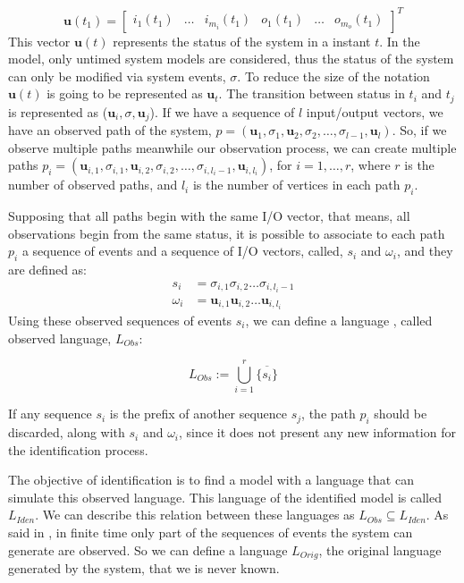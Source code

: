 \begin{equation*}
\mathbf{u}(t_1)=
\begin{bmatrix}
  i_1(t_1)&
  \dots&
  i_{m_i}(t_1)&
  o_1(t_1)&
  \dots&
  o_{m_o}(t_1)
\end{bmatrix}^T
\end{equation*}
\newcommand{\vu}{\mathbf{u}}
 This vector $\mathbf{u}(t)$ represents the status of the system in a instant
 $t$. In the \DAOCT model, only untimed system models are considered, thus
 the status of the system can only be modified via system events, $\sigma$. To
 reduce the size of the notation $\mathbf{u}(t)$ is going to be represented as $\vu_t$. The
 transition between status in $t_i$ and $t_j$ is represented as ($\vu_i,\sigma,\vu_j$). If we have a sequence of
 $l$ input\slash output vectors, we have an observed path of the system,
 $p=(\vu_1,\sigma_1,\vu_2,\sigma_2,\dots,\sigma_{l-1},\vu_l)$.
So, if we observe multiple paths meanwhile our observation process, we can
create multiple paths
$p_i=(\vu_{i,1},\sigma_{i,1},\vu_{i,2},\sigma_{i,2},\dots,\sigma_{i,l_i-1},\vu_{i,l_i})$,
for $i=1,\dots,r$, where $r$ is the number of observed paths, and $l_i$ is the
number of vertices in each path $p_i$.

Supposing that all paths begin with the same I\slash O vector, that means, all
observations begin from the same status, it is possible to associate to each
path $p_i$ a sequence of events and a sequence of I\slash O vectors, called,
$s_i$ and $\omega_i$, and they are defined as:
\begin{align*}
  s_i&= \sigma_{i,1}\sigma_{i,2}\dots\sigma_{i,l_i-1} \\
  \omega_i&= \vu_{i,1}\vu_{i,2}\dots\vu_{i,l_i}
\end{align*}
Using these observed sequences of events $s_i$, we can define a language
, called observed language, $L_{Obs}$:

\begin{equation}
  L_{Obs}:= \bigcup^r_{i=1}\overline{\{s_i\}}
\end{equation}
\begin{observation}
If any sequence $s_i$ is the prefix of another sequence $s_j$, the path $p_i$ should
be discarded, along with $s_i$ and $\omega_i$, since it does not present any new
information for the identification process.
\end{observation}
The objective of identification is to find a model with a language that
can simulate this observed language. This language of the identified model is
called $L_{Iden}$.
We can describe this relation between these languages as $L_{Obs} \subseteq
L_{Iden}$.
As said in
\cite{moreira2018enhanced}, in finite time only part of the sequences  of events
the system can generate are observed. So we can define a language $L_{Orig}$,
the original language generated by the system, that we is never known.

